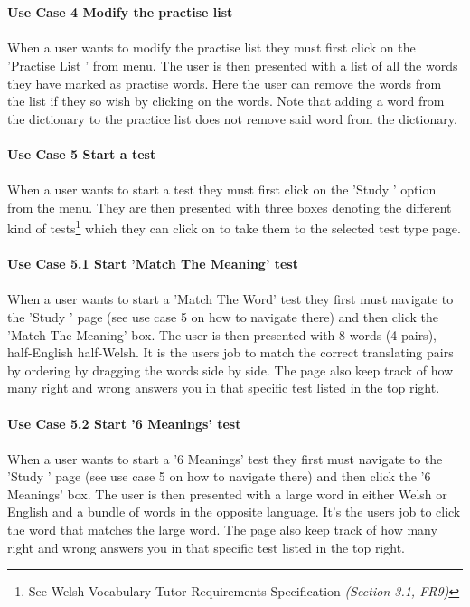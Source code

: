 \documentclass{project}
\newcommand*{\icon}[1]{%
  \raisebox{-.3\baselineskip}{%
    \texttt{[image: \#1]}%
  }%
}
\begin{document}
\\\\
\textbf{Use Case 4 Modify the practise list}
\\\\
When a user wants to modify the practise list they must first click on the 'Practise List \icon{practise-icon}' from menu. The user is then presented with a list of all the words they have marked as practise words. Here the user can remove the words from the list if they so wish by clicking on the words. Note that adding a word from the dictionary to the practice list does not remove said word from the dictionary.
\\\\
\textbf{Use Case 5 Start a test}
\\\\
When a user wants to start a test they must first click on the 'Study \icon{study-icon}' option from the menu. They are then presented with three boxes denoting the different kind of tests\footnote{See Welsh Vocabulary Tutor Requirements Specification\cite{se.qa.csrs} \textit{(Section 3.1, FR9)}} which they can click on to take them to the selected test type page.
\\\\
\textbf{Use Case 5.1 Start 'Match The Meaning' test}
\\\\
When a user wants to start a 'Match The Word' test they first must navigate to the 'Study \icon{study-icon}' page (see use case 5 on how to navigate there) and then click the 'Match The Meaning' box. The user is then presented with 8 words (4 pairs), half-English half-Welsh. It is the users job to match the correct translating pairs by ordering by dragging the words side by side. The page also keep track of how many right and wrong answers you in that specific test listed in the top right.
\\\\
\textbf{Use Case 5.2 Start '6 Meanings' test}
\\\\
When a user wants to start a '6 Meanings' test they first must navigate to the 'Study \icon{study-icon}' page (see use case 5 on how to navigate there) and then click the '6 Meanings' box. The user is then presented with a large word in either Welsh or English and a bundle of words in the opposite language. It's the users job to click the word that matches the large word. The page also keep track of how many right and wrong answers you in that specific test listed in the top right.
\end{document}
